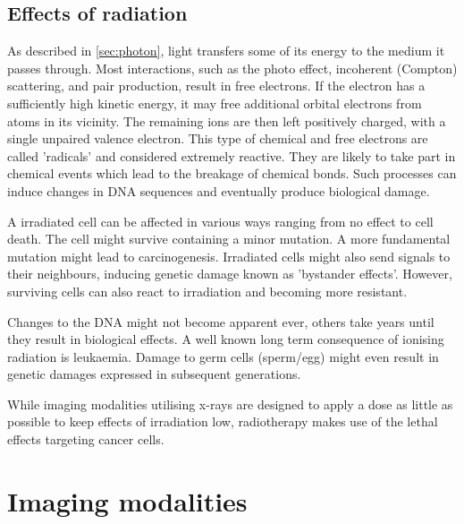 \subsection{Effects of radiation}
\label{sec:irradiate}

As described in \ref{sec:photon}, light transfers some of its energy to the medium it passes through.
Most interactions, such as the photo effect, incoherent (Compton) scattering, and pair production, result in free electrons.
If the electron has a sufficiently high kinetic energy, it may free additional orbital electrons from atoms in its vicinity.
The remaining ions are then left positively charged, with a single unpaired valence electron.
This type of chemical and free electrons are called 'radicals' and considered extremely reactive.
They are likely to take part in chemical events which lead to the breakage of chemical bonds.
Such processes can induce changes in DNA sequences and eventually produce biological damage.

A irradiated cell can be affected in various ways ranging from no effect to cell death.
The cell might survive containing a minor mutation.
A more fundamental mutation might lead to carcinogenesis.
Irradiated cells might also send signals to their neighbours, inducing genetic damage known as 'bystander effects'.
However, surviving cells can also react to irradiation and becoming more resistant.

Changes to the DNA might not become apparent ever, others take years until they result in biological effects.
A well known long term consequence of ionising radiation is leukaemia.
Damage to germ cells (sperm/egg) might even result in genetic damages expressed in subsequent generations.

While imaging modalities utilising x-rays are designed to apply a dose as little as possible to keep effects of irradiation low, radiotherapy makes use of the lethal effects targeting cancer cells. \cite{Podgorsak, Maidment2014}

\section{Imaging modalities}
